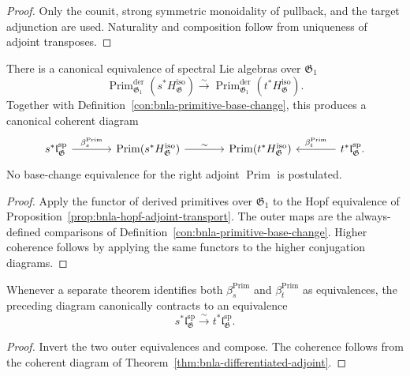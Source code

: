 \begin{proof}
Only the counit, strong symmetric monoidality of pullback, and the target
adjunction are used.  Naturality and composition follow from uniqueness of
adjoint transposes.
\end{proof}

\begin{theorem}
\label{thm:bnla-differentiated-adjoint}
There is a canonical equivalence of spectral Lie algebras over $\mathfrak G_1$
\[
    \operatorname{Prim}^{\mathrm{der}}_{\mathfrak G_1}
    \left(s^*H^{\mathrm{iso}}_{\mathfrak G}\right)
    \xrightarrow{\sim}
    \operatorname{Prim}^{\mathrm{der}}_{\mathfrak G_1}
    \left(t^*H^{\mathrm{iso}}_{\mathfrak G}\right).
\]
Together with Definition~\ref{con:bnla-primitive-base-change}, this produces
a canonical coherent diagram
\[
\begin{tikzcd}[column sep=large]
s^*\mathfrak l^{\mathrm{sp}}_{\mathfrak G}
  \arrow[r,"\beta^{\mathrm{Prim}}_{s}"] &
\operatorname{Prim}(s^*H^{\mathrm{iso}}_{\mathfrak G})
  \arrow[r,"\sim"] &
\operatorname{Prim}(t^*H^{\mathrm{iso}}_{\mathfrak G}) &
 t^*\mathfrak l^{\mathrm{sp}}_{\mathfrak G}
  \arrow[l,"\beta^{\mathrm{Prim}}_{t}"'].
\end{tikzcd}
\]
No base-change equivalence for the right adjoint $\operatorname{Prim}$ is
postulated.
\end{theorem}

\begin{proof}
Apply the functor of derived primitives over $\mathfrak G_1$ to the Hopf
equivalence of Proposition~\ref{prop:bnla-hopf-adjoint-transport}.  The outer
maps are the always-defined comparisons of
Definition~\ref{con:bnla-primitive-base-change}.  Higher coherence follows
by applying the same functors to the higher conjugation diagrams.
\end{proof}

\begin{corollary}
\label{cor:bnla-literal-primitive-transport}
Whenever a separate theorem identifies both
$\beta^{\mathrm{Prim}}_{s}$ and $\beta^{\mathrm{Prim}}_{t}$ as equivalences,
the preceding diagram canonically contracts to an equivalence
\[
    s^*\mathfrak l^{\mathrm{sp}}_{\mathfrak G}
    \xrightarrow{\sim}
    t^*\mathfrak l^{\mathrm{sp}}_{\mathfrak G}.
\]
\end{corollary}

\begin{proof}
Invert the two outer equivalences and compose.  The coherence follows from the
coherent diagram of Theorem~\ref{thm:bnla-differentiated-adjoint}.
\end{proof}

